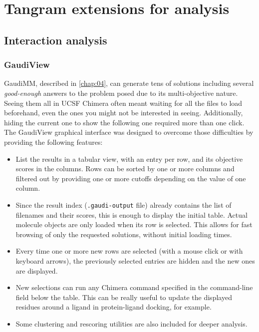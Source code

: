 
\chapter{Tangram extensions for analysis}
\label{appendix:more-tangram}

\section{Interaction analysis}
\subsection{GaudiView}
GaudiMM, described in \autoref{chap:04}, can generate tens of solutions including several \textit{good-enough} answers to the problem posed due to its multi-objective nature. Seeing them all in UCSF Chimera often meant waiting for all the files to load beforehand, even the ones you might not be interested in seeing. Additionally, hiding the current one to show the following one required more than one click. The GaudiView graphical interface was designed to overcome those difficulties by providing the following features:

\begin{itemize}
	\item List the results in a tabular view, with an entry per row, and its objective scores in the columns. Rows can be sorted by one or more columns and filtered out by providing one or more cutoffs depending on the value of one column.

	\item Since the result index (\texttt{.gaudi-output} file) already contains the list of filenames and their scores, this is enough to display the initial table. Actual molecule objects are only loaded when its row is selected. This allows for fast browsing of only the requested solutions, without initial loading times.

	\item Every time one or more new rows are selected (with a mouse click or with keyboard arrows), the previously selected entries are hidden and the new ones are displayed.

	\item New selections can run any Chimera command specified in the command-line field below the table. This can be really useful to update the displayed residues around a ligand in protein-ligand docking, for example.

	\item Some clustering and rescoring utilities are also included for deeper analysis.
\end{itemize}

